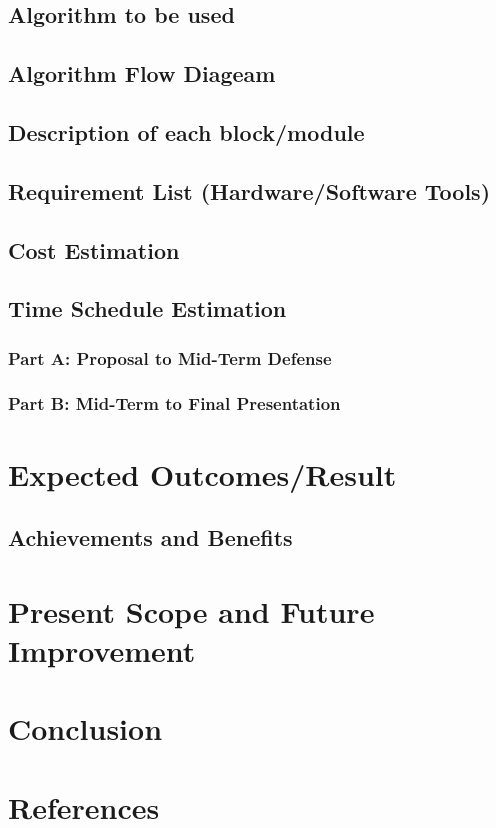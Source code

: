 \documentclass{article}
\begin{document}
\subsection{Algorithm to be used}
\cleardoublepage

\subsection{Algorithm Flow Diageam}
\cleardoublepage

\subsection{Description of each block/module}
\cleardoublepage

\subsection{Requirement List (Hardware/Software Tools)}
\cleardoublepage

\subsection{Cost Estimation}
\cleardoublepage

\subsection{Time Schedule Estimation}
\cleardoublepage
\subsubsection{Part A: Proposal to Mid-Term Defense}
\cleardoublepage
\subsubsection{Part B: Mid-Term to Final Presentation}
\cleardoublepage

\section{Expected Outcomes/Result}
\cleardoublepage
\subsection{Achievements and Benefits}
\cleardoublepage

\section{Present Scope and Future Improvement}
\cleardoublepage

\section{Conclusion}
\cleardoublepage
\section*{References}


\nocite{*}
\end{document}
